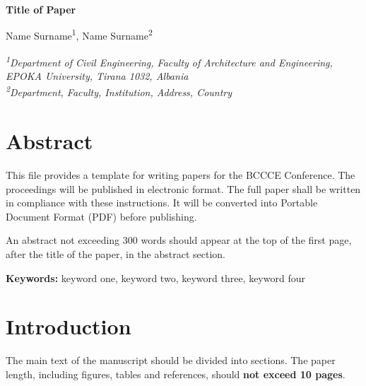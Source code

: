 \documentclass[a4paper,12pt]{article}
\begin{document}
\begin{center}
  {\fontsize{14}{16}\selectfont\bfseries Title of Paper}\par
  \vspace{12pt}
  {\fontsize{12}{14}\selectfont
   Name Surname\textsuperscript{1}, Name Surname\textsuperscript{2}}\par
  \vspace{4pt}
  {\fontsize{10}{12}\selectfont\itshape
   \textsuperscript{1}Department of Civil Engineering, Faculty of Architecture
   and Engineering, EPOKA University, Tirana 1032, Albania\\
   \textsuperscript{2}Department, Faculty, Institution, Address, Country}\par
\end{center}
\vspace{8pt}

\section*{Abstract}
This file provides a template for writing papers for the BCCCE Conference. The
proceedings will be published in electronic format. The full paper shall be
written in compliance with these instructions. It will be converted into
Portable Document Format (PDF) before publishing.

An abstract not exceeding 300 words should appear at the top of the first page,
after the title of the paper, in the abstract section.

\vspace{6pt}
\noindent\textbf{Keywords:} keyword one, keyword two, keyword three, keyword four

\section{Introduction}
The main text of the manuscript should be divided into sections. The paper
length, including figures, tables and references, should \textbf{not exceed
10 pages}.
\end{document}
